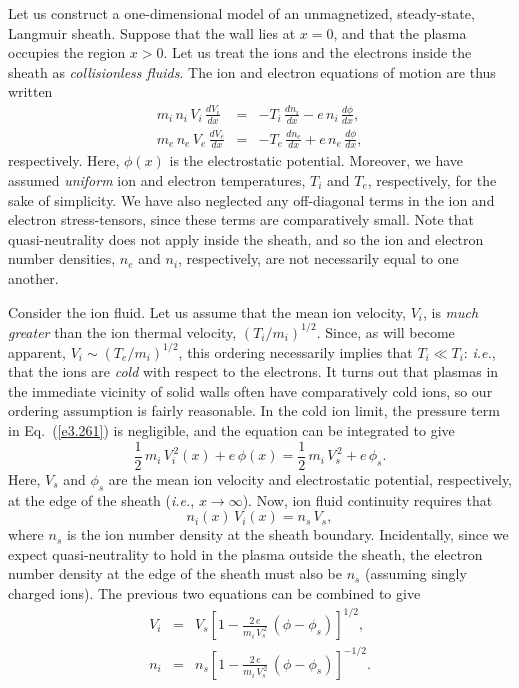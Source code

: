 Let us construct a one-dimensional model of an unmagnetized, steady-state,   Langmuir sheath. 
Suppose that the wall lies at $x=0$, and that the plasma occupies the
region $x>0$. Let us treat the ions and the electrons inside the sheath
as {\em collisionless fluids}. 
The ion and electron equations of
motion are thus written
\begin{eqnarray}
m_i\,n_i\,V_i\,\frac{dV_i}{dx} &=& - T_i\,\frac{dn_i}{dx} - e\,n_i\,\frac{d\phi}{dx},\label{e3.261}\\[0.5ex]
m_e\,n_e\,V_e\,\frac{dV_e}{dx} &=& - T_e\,\frac{dn_e}{dx} + e\,n_e\,\frac{d\phi}{dx},\label{e3.262}
\end{eqnarray}
respectively. Here, $\phi(x)$ is the electrostatic potential. Moreover, we have
assumed {\em uniform}\/ ion and electron temperatures, $T_i$ and $T_e$,
respectively, for the sake of simplicity. We have also neglected any off-diagonal
terms in the ion and electron stress-tensors, since these terms are
comparatively small. 
 Note that quasi-neutrality
does not apply inside the sheath, and so the ion and
electron number densities, $n_e$ and $n_i$, respectively, are not
necessarily equal to one another.

Consider the ion fluid. Let us assume that the mean ion velocity, $V_i$,
is {\em much greater}\/ than the ion thermal velocity, $(T_i/m_i)^{1/2}$. Since,
as will become apparent, $V_i\sim (T_e/m_i)^{1/2}$, this ordering necessarily  implies
that $T_i\ll T_i$: {\em i.e.}, that the ions are
{\em cold}\/ with respect to the electrons. It turns out that plasmas in the
immediate vicinity of solid walls often  have comparatively cold ions, so our ordering assumption
is fairly reasonable.  In the cold ion limit, the pressure term in Eq.~(\ref{e3.261})
is negligible, and the  equation can be integrated to
give
\begin{equation}
\frac{1}{2}\,m_i\,V_i^{\,2}(x) + e\,\phi(x) = \frac{1}{2}\,m_i\,V_s^{\,2} + e\,\phi_s.
\end{equation}
Here, $V_s$ and $\phi_s$ are the mean ion velocity and electrostatic
potential, respectively, at the edge of the sheath ({\em i.e.}, $x\rightarrow\infty$). 
Now,  ion fluid continuity requires that
\begin{equation}
n_i(x)\,V_i(x) = n_s\,V_s,
\end{equation}
where $n_s$ is the ion number density at the  sheath boundary. Incidentally, since we
expect quasi-neutrality to hold in the plasma outside the sheath, the electron number density
at the edge of the sheath must also be $n_s$ (assuming singly charged
ions). The previous two equations can be combined to give
\begin{eqnarray}
V_i &=& V_s\left[1- \frac{2\,e}{m_i\,V_s^{\,2}}\,(\phi-\phi_s)\right]^{1/2},\\[0.5ex]
n_i&=& n_s\left[1- \frac{2\,e}{m_i\,V_s^{\,2}}\,(\phi-\phi_s)\right]^{-1/2}.
\end{eqnarray}

